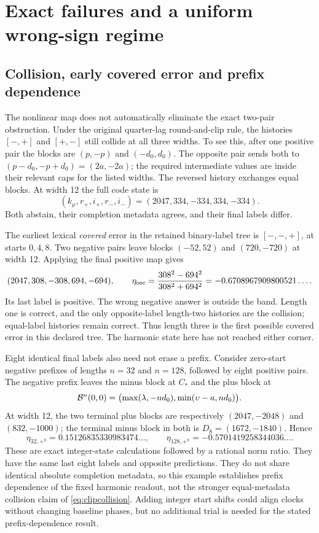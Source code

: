 \section{Exact failures and a uniform wrong-sign regime}\label{sec:failures}
\subsection{Collision, early covered error and prefix dependence}
The nonlinear map does not automatically eliminate the exact two-pair obstruction. Under the original quarter-lag round-and-clip rule, the histories $[-,+]$ and $[+,-]$ still collide at all three widths. To see this, after one positive pair the blocks are $(p,-p)$ and $(-d_0,d_0)$. The opposite pair sends both to $(p-d_0,-p+d_0)=(2a,-2a)$; the required intermediate values are inside their relevant caps for the listed widths. The reversed history exchanges equal blocks. At width 12 the full code state is
\begin{equation}\label{eq:clipcollision}
 (k_\mu,r_+,i_+,r_-,i_-)=(2047,334,-334,334,-334).
\end{equation}
Both abstain, their completion metadata agrees, and their final labels differ.

The earliest lexical \emph{covered} error in the retained binary-label tree is $[-,-,+]$, at starts $0,4,8$. Two negative pairs leave blocks $(-52,52)$ and $(720,-720)$ at width 12. Applying the final positive map gives
\begin{equation}\label{eq:three}
 (2047,308,-308,694,-694),\qquad
 \eta_{\rm osc}=\frac{308^2-694^2}{308^2+694^2}
       =-0.6708967909800521\ldots .
\end{equation}
Its last label is positive. The wrong negative answer is outside the band. Length one is correct, and the only opposite-label length-two histories are the collision; equal-label histories remain correct. Thus length three is the first possible covered error in this declared tree. The harmonic state here has not reached either corner.

Eight identical final labels also need not erase a prefix. Consider zero-start negative prefixes of lengths $n=32$ and $n=128$, followed by eight positive pairs. The negative prefix leaves the minus block at $C_*$ and the plus block at
\[
 \mathcal B^n(0,0)=\bigl(\max(\lambda,-nd_0),\min(\upsilon-a,nd_0)\bigr).
\]
At width 12, the two terminal plus blocks are respectively $(2047,-2048)$ and $(832,-1000)$; the terminal minus block in both is $D_8=(1672,-1840)$. Hence
\begin{equation}\label{eq:eightsuffix}
 \eta_{32,+^8}=0.15126835330983474\ldots,\qquad
 \eta_{128,+^8}=-0.5701419258344036\ldots .
\end{equation}
These are exact integer-state calculations followed by a rational norm ratio. They have the same last eight labels and opposite predictions. They do not share identical absolute completion metadata, so this example establishes prefix dependence of the fixed harmonic readout, not the stronger equal-metadata collision claim of \eqref{eq:clipcollision}. Adding integer start shifts could align clocks without changing baseline phases, but no additional trial is needed for the stated prefix-dependence result.


